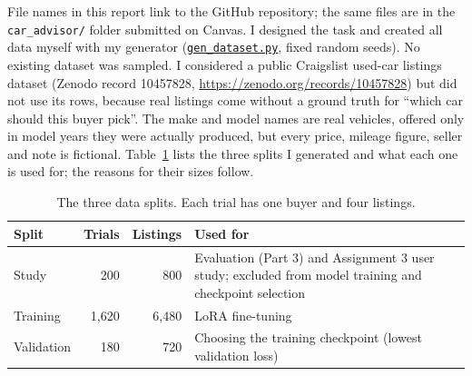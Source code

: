 \documentclass[11pt]{article}
\newcommand{\code}[1]{\texttt{\small #1}}
\newcommand{\repourl}{https://github.com/rajdeeepm/ai-car-advisor}
\newcommand{\gh}[2]{\href{\repourl/blob/main/#1}{\code{#2}}}
\begin{document}
File names in this report link to the GitHub repository; the same files are in the
\code{car\_advisor/} folder submitted on Canvas. I designed the task and created all data myself with my generator (\gh{gen_dataset.py}{gen\_dataset.py},
fixed random seeds). No existing dataset was sampled. I considered a public Craigslist used-car
listings dataset (Zenodo record 10457828, \url{https://zenodo.org/records/10457828}) but did not use
its rows, because real listings come without a ground truth for ``which car should this buyer
pick''. The make and model names are real vehicles, offered only in model years they were actually
produced, but every price, mileage figure, seller and note is fictional.
Table~\ref{tab:splits} lists the three splits I generated and what each one is used for; the
reasons for their sizes follow.

\begin{table}[htbp]
\centering
\caption{The three data splits. Each trial has one buyer and four listings.}
\label{tab:splits}
\begin{tabularx}{\linewidth}{lrrX}
\toprule
Split & Trials & Listings & Used for \\
\midrule
Study & 200 & 800 & Evaluation (Part 3) and Assignment 3 user study; excluded from model training and checkpoint selection \\
Training & 1,620 & 6,480 & LoRA fine-tuning \\
Validation & 180 & 720 & Choosing the training checkpoint (lowest validation loss) \\
\bottomrule
\end{tabularx}
\end{table}
\end{document}
